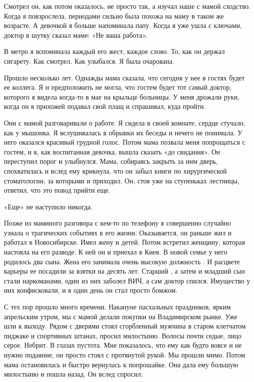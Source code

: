 Смотрел он, как потом оказалось, не просто так, а изучал наше с мамой сходство.
Когда я повзрослела, периодами сильно была похожа на маму в таком же возрасте.
А девочкой я больше напоминала папу. Когда я уже ушла с ключами, доктор в шутку
сказал маме: «Не ваша работа».

В метро я вспоминала каждый его жест, каждое слово. То, как он держал сигарету.
Как смотрел. Как улыбался. Я была очарована.

Прошло несколько лет. Однажды мама сказала, что сегодня у нее в гостях будет ее
коллега. Я и предположить не могла, что гостем будет тот самый доктор, которого
я видела когда-то в мае на крыльце больницы. У меня дрожали руки, когда он в
прихожей подавал свой плащ и спрашивал, куда пройти. 

Они с мамой разговаривали о работе. Я сидела в своей комнате, сердце стучало,
как у мышонка. Я вслушивалась в обрывки их беседы и нечего  не понимала. У него
оказался красивый грудной голос. Потом мама позвала меня попрощаться с гостем,
и я, как воспитанная девочка, вышла сказать «до свидания». Он переступил порог
и улыбнулся. Мама, собираясь закрыть за ним дверь, спохватилась и вслед ему
крикнула, что он забыл книги по хирургической стоматологии, за которыми и
приходил. Он, стоя уже на ступеньках лестницы, ответил, что это повод прийти
еще. 

«Еще» не наступило никогда. 

Позже из маминого разговора с кем-то по телефону я совершенно случайно узнала о
трагических событиях в его жизни. Оказывается, он раньше жил и работал в
Новосибирске. Имел жену и детей. Потом встретил женщину, которая настояла на
его разводе. К ней он и приехал в Киев. В новой семье у него родилось два сына.
Жена его занимала очень высокую должность . И расцвете карьеры ее посадили за
взятки на десять лет. Старший , а затем и младший  сын стали наркоманами, один
из них заболел ВИЧ, а сам доктор спился. Имущество у них конфисковали, и в один
день он стал просто бомжом.

С тех пор прошло много времени. Накануне пасхальных праздников, ярким
апрельским утром, мы с мамой делали покупки на Владимирском рынке. Уже шли к
выходу. Рядом с дверями стоял сгорбленный мужчина в старом клетчатом пиджаке и
спортивных штанах, просил милостыню. Волосы почти седые, лицо серое. Небрит. В
глазах пустота. Мне показалось, что ему как будто вовсе и не нужно подаяние, он
просто стоял с протянутой рукой. Мы прошли мимо. Потом мама остановилась и
быстро вернулась к попрошайке. Она дала ему большую милостыню и пошла назад. Он
вслед спросил: 

